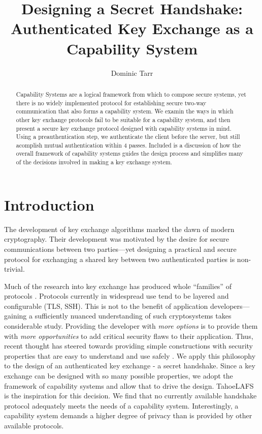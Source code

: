 \documentclass[12pt]{article}
\begin{document}
\title{Designing a Secret Handshake: Authenticated Key Exchange as a Capability System}
\author{Dominic Tarr}


\maketitle

\begin{abstract}
Capability Systems are a logical framework from which to compose secure
systems, yet there is no widely implemented protocol for establishing
secure two-way communication that also forms a capability system.
We examin the ways in which other key exchange protocols fail to
be suitable for a capability system, and then present a secure key
exchange protocol designed with capability systems in mind.
Using a preauthentication step, we authenticate the client before
the server, but still acomplish mutual authentication within 4 passes.
Included is a discussion of how the overall framework of capability
systems guides the design process and simplifies many of the decisions
involved in making a key exchange system.

\end{abstract}

\section{Introduction}

The development of key exchange algorithms marked the dawn of
modern cryptography\cite{ndic}. Their development was motivated
by the desire for secure communications between two parties---yet
designing a practical and secure protocol for exchanging
a shared key between two authenticated parties is non-trivial\cite{aake}.

Much of the research into key exchange has produced whole ``families'' of
protocols \cite{sigma}. Protocols currently in widespread
use tend to be layered and configurable (TLS, SSH). This is not
to the benefit of application developers---gaining a sufficiently
nuanced understanding of such cryptosystems takes considerable study.
Providing the developer with \emph{more options} is to provide them
with \emph{more opportunities} to add critical security flaws to their
application. Thus, recent thought has steered towards providing simple constructions
with security properties that are easy to understand and use safely
\cite{nacl}. We apply this philosophy to the design of an authenticated
key exchange - a secret handshake. Since a key exchange can be designed
with so many possible properties, we adopt the framework of capability
systems\cite{unicap} and allow that to drive the design.
TahoeLAFS\cite{tahoe} is the inspiration for this decision.
We find that no currently available handshake protocol adequately meets
the needs of a capability system. Interestingly, a capability system
demands a higher degree of privacy than is provided by other available
protocols.
\end{document}
